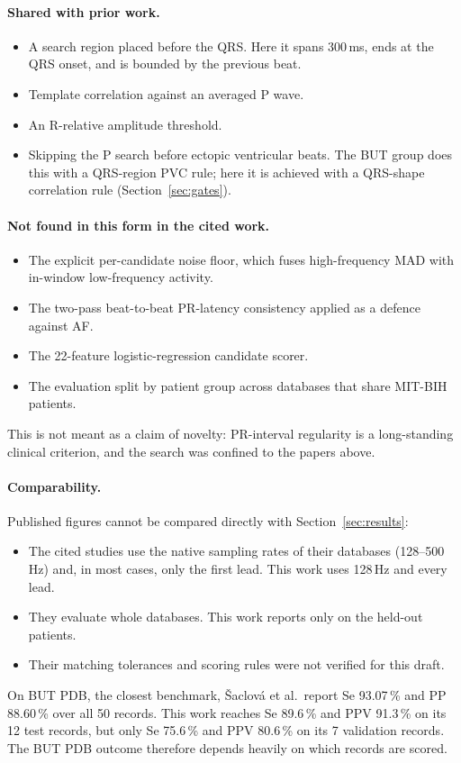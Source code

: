 \documentclass[11pt,a4paper]{article}
\begin{document}
\paragraph{Shared with prior work.}
\begin{itemize}
\item A search region placed before the QRS. Here it spans 300\,ms, ends at the QRS onset, and is bounded by the previous beat.
\item Template correlation against an averaged P wave.
\item An R-relative amplitude threshold.
\item Skipping the P search before ectopic ventricular beats. The BUT group does this with a QRS-region PVC rule; here it is achieved with a QRS-shape correlation rule (Section~\ref{sec:gates}).
\end{itemize}

\paragraph{Not found in this form in the cited work.}
\begin{itemize}
\item The explicit per-candidate noise floor, which fuses high-frequency MAD with in-window low-frequency activity.
\item The two-pass beat-to-beat PR-latency consistency applied as a defence against AF.
\item The 22-feature logistic-regression candidate scorer.
\item The evaluation split by patient group across databases that share MIT-BIH patients.
\end{itemize}
This is not meant as a claim of novelty: PR-interval regularity is a long-standing clinical criterion, and the search was confined to the papers above.

\paragraph{Comparability.} Published figures cannot be compared directly with Section~\ref{sec:results}:
\begin{itemize}
\item The cited studies use the native sampling rates of their databases (128--500\,Hz) and, in most cases, only the first lead. This work uses 128\,Hz and every lead.
\item They evaluate whole databases. This work reports only on the held-out patients.
\item Their matching tolerances and scoring rules were not verified for this draft.
\end{itemize}
On BUT PDB, the closest benchmark, Šaclová et al.\ report Se 93.07\,\% and PP 88.60\,\% over all 50 records. This work reaches Se 89.6\,\% and PPV 91.3\,\% on its 12 test records, but only Se 75.6\,\% and PPV 80.6\,\% on its 7 validation records. The BUT PDB outcome therefore depends heavily on which records are scored.
\end{document}
